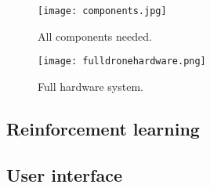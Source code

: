\documentclass[../main.tex]{subfiles}
\begin{document}
\begin{figure}[p]
	\centering
	\texttt{[image: components.jpg]}
	\caption{All components needed.}
	\label{fig:components}
\end{figure}

\begin{figure}[h]
	\centering
	\texttt{[image: fulldronehardware.png]}
	\caption{Full hardware system.}
	\label{fig:full-hardware}
\end{figure}  



\subsection{Reinforcement learning}

\lipsum[1]

\subsection{User interface}

\lipsum[1]
\end{document}
